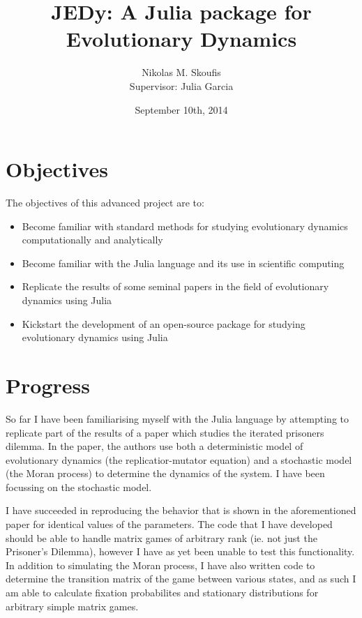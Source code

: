 \documentclass[a4paper,11pt]{article}
\begin{document}
\title{JEDy: A Julia package for Evolutionary Dynamics}
\author{Nikolas M. Skoufis \\ Supervisor: Julia Garcia}
\date{September 10th, 2014}

\maketitle

\section*{Objectives}

The objectives of this advanced project are to:

\begin{itemize}
        
    \item Become familiar with standard methods for studying evolutionary dynamics computationally and analytically
    \item Become familiar with the Julia \cite{julia} language and its use in scientific computing
    \item Replicate the results of some seminal papers in the field of evolutionary dynamics using Julia
    \item Kickstart the development of an open-source package for studying evolutionary dynamics using Julia

\end{itemize}

\section*{Progress}

So far I have been familiarising myself with the Julia language by attempting to replicate part of the results of a paper \cite{imhofetal} which studies the iterated prisoners dilemma.
In the paper, the authors use both a deterministic model of evolutionary dynamics (the replicatior-mutator equation) and a stochastic model (the Moran process) to determine the dynamics of the system.
I have been focussing on the stochastic model.

I have succeeded in reproducing the behavior that is shown in the aforementioned paper for identical values of the parameters.
The code that I have developed should be able to handle matrix games of arbitrary rank (ie. not just the Prisoner's Dilemma), however I have as yet been unable to test this functionality.
In addition to simulating the Moran process, I have also written code to determine the transition matrix of the game between various states, and as such I am able to calculate fixation probabilites and stationary distributions for arbitrary simple matrix games.
\end{document}
